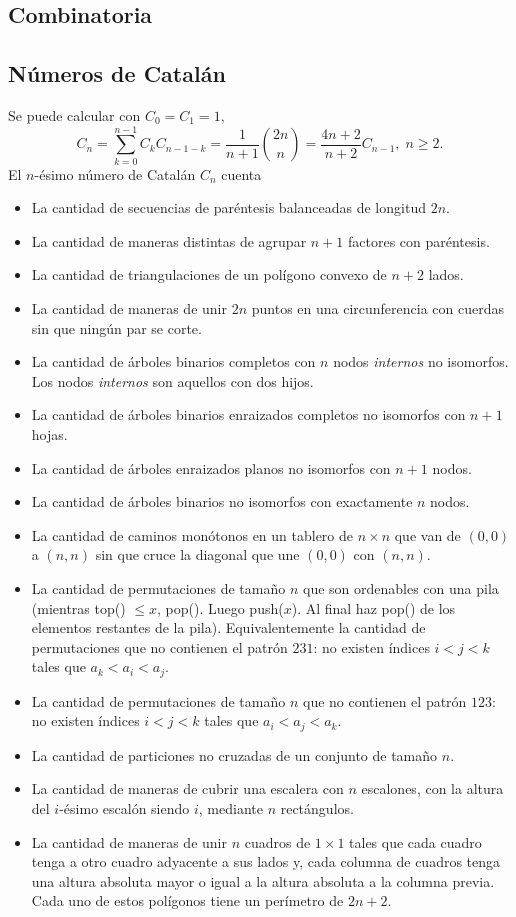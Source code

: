 \documentclass[12 pts,spanish,mexico]{article}
\numberwithin{equation}{section}
\begin{document}
\begin{multicols}{2}
\section{Combinatoria}

\subsection{Números de Catalán}

Se puede calcular con $C_0 = C_1 = 1$,
$$C_n = \sum_{k = 0}^{n - 1} C_kC_{n - 1 - k} = \frac{1}{n + 1}\binom{2n}{n} = \frac{4n + 2}{n + 2}C_{n - 1},\; n \geq 2.$$
El $n$-ésimo número de Catalán $C_n$ cuenta
\begin{itemize}
    \item La cantidad de secuencias de paréntesis balanceadas de longitud $2n$.
    \item La cantidad de maneras distintas de agrupar $n + 1$ factores con paréntesis.
    \item La cantidad de triangulaciones de un polígono convexo de $n + 2$ lados.
    \item La cantidad de maneras de unir $2n$ puntos en una circunferencia con cuerdas sin que ningún par se corte.
    \item La cantidad de árboles binarios completos con $n$ nodos \textit{internos} no isomorfos. Los nodos \textit{internos} son aquellos con dos hijos.
    \item La cantidad de árboles binarios enraizados completos no isomorfos con $n + 1$ hojas.
    \item La cantidad de árboles enraizados planos no isomorfos con $n + 1$ nodos.
    \item La cantidad de árboles binarios no isomorfos con exactamente $n$ nodos.
    \item La cantidad de caminos monótonos en un tablero de $n \times n$ que van de $(0, 0)$ a $(n, n)$ sin que cruce la diagonal que une $(0, 0)$ con $(n, n)$.
    \item La cantidad de permutaciones de tamaño $n$ que son ordenables con una pila (mientras top() $\leq x$, pop(). Luego push($x$). Al final haz pop() de los elementos restantes de la pila). Equivalentemente la cantidad de permutaciones que no contienen el patrón $231$: no existen índices $i < j < k$ tales que $a_k < a_i < a_j$.
    \item La cantidad de permutaciones de tamaño $n$ que no contienen el patrón $123$: no existen índices $i < j < k$ tales que $a_i < a_j < a_k$.
    \item La cantidad de particiones no cruzadas de un conjunto de tamaño $n$.
    \item La cantidad de maneras de cubrir una escalera con $n$ escalones, con la altura del $i$-ésimo escalón siendo $i$, mediante $n$ rectángulos.
    \item La cantidad de maneras de unir $n$ cuadros de $1 \times 1$ tales que cada cuadro tenga a otro cuadro adyacente a sus lados y, cada columna de cuadros tenga una altura absoluta mayor o igual a la altura absoluta a la columna previa. Cada uno de estos polígonos tiene un perímetro de $2n + 2$.
\end{itemize}


\end{multicols}
\end{document}
